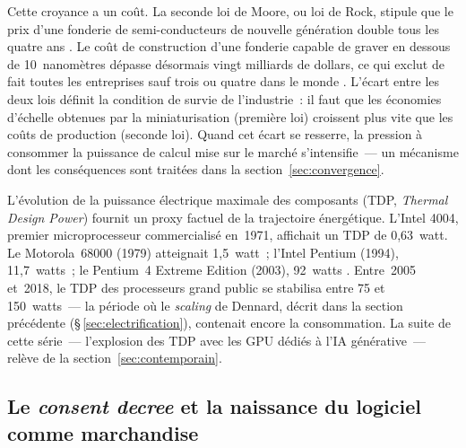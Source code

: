%
Cette croyance a un coût. La \og seconde loi de Moore\fg{}, ou loi de Rock, stipule que le prix d'une fonderie de semi-conducteurs de nouvelle génération double tous les quatre ans \parencite{ross_moores_1995}. Le coût de construction d'une fonderie capable de graver en dessous de 10~nanomètres dépasse désormais vingt milliards de dollars, ce qui exclut de fait toutes les entreprises sauf trois ou quatre dans le monde \parencite{gruber_semiconductor_1996, roussilhe_phase_2025}. L'écart entre les deux \og lois\fg{} définit la condition de survie de l'industrie~: il faut que les économies d'échelle obtenues par la miniaturisation (première loi) croissent plus vite que les coûts de production (seconde loi). Quand cet écart se resserre, la pression à \og consommer\fg{} la puissance de calcul mise sur le marché s'intensifie~--- un mécanisme dont les conséquences sont traitées dans la section~\ref{sec:convergence}.

%
L'évolution de la puissance électrique maximale des composants (TDP, \emph{Thermal Design Power}) fournit un proxy factuel de la trajectoire énergétique. L'Intel 4004, premier microprocesseur commercialisé en~1971, affichait un TDP de 0,63~watt. Le Motorola~68000 (1979) atteignait 1,5~watt~; l'Intel Pentium (1994), 11,7~watts~; le Pentium~4 Extreme Edition (2003), 92~watts \parencite{sun_chip_2024, roussilhe_phase_2025}. Entre~2005 et~2018, le TDP des processeurs grand public se stabilisa entre 75 et 150~watts~--- la période où le \emph{scaling} de Dennard, décrit dans la section précédente (§\,\ref{sec:electrification}), contenait encore la consommation. La suite de cette série~--- l'explosion des TDP avec les GPU dédiés à l'IA générative~--- relève de la section~\ref{sec:contemporain}.


\subsection{Le \emph{consent decree} et la naissance du logiciel comme marchandise}\label{subsec:consent_decree}

